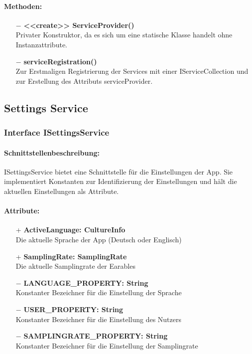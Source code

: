 \documentclass[a4paper,12pt]{article}
\begin{document}
	\paragraph{Methoden:}
	\begin{itemize}
		\item[$-$] \textbf{<<create>> ServiceProvider()}\\Privater Konstruktor, da es sich um eine statische Klasse handelt ohne Instanzattribute.
		\item[$-$] \textbf{serviceRegistration()}\\ Zur Erstmaligen Registrierung der Services mit einer IServiceCollection und zur Erstellung des Attributs serviceProvider.\\
	\end{itemize}
		
		
		
		
		
\subsection{Settings Service}
\subsubsection{Interface ISettingsService}
	\paragraph{Schnittstellenbeschreibung:}
	ISettingsService bietet eine Schnittstelle für die Einstellungen der App. Sie implementiert Konstanten zur Identifizierung der Einstellungen und hält die aktuellen Einstellungen als Attribute.
	\paragraph{Attribute:}
	\begin{itemize}
		\item[+] \textbf{ActiveLanguage: CultureInfo}\\Die aktuelle Sprache der App (Deutsch oder Englisch)\\
		\item[+] \textbf{SamplingRate: SamplingRate}\\Die aktuelle Samplingrate der \Gls{Earables} \\ 
		\item[$-$] \textbf{LANGUAGE\_PROPERTY: String}\\Konstanter Bezeichner für die Einstellung der Sprache \\
		\item[$-$] \textbf{USER\_PROPERTY: String}\\Konstanter Bezeichner für die Einstellung des Nutzers \\
		\item[$-$] \textbf{SAMPLINGRATE\_PROPERTY: String}\\Konstanter Bezeichner für die Einstellung der Samplingrate \\
	\end{itemize}
\end{document}
